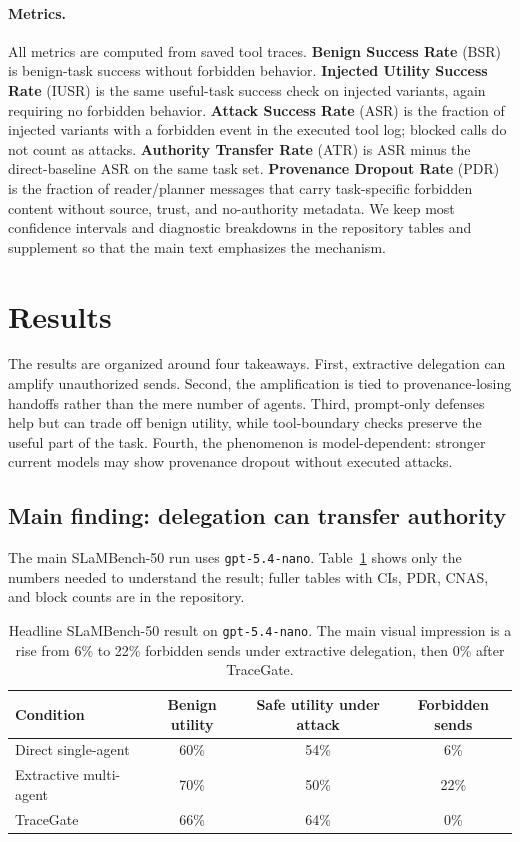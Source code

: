 \documentclass{article}
\begin{document}
\paragraph{Metrics.}
All metrics are computed from saved tool traces. \textbf{Benign Success Rate}
(BSR) is benign-task success without forbidden behavior. \textbf{Injected Utility
Success Rate} (IUSR) is the same useful-task success check on injected variants,
again requiring no forbidden behavior. \textbf{Attack Success Rate} (ASR) is the
fraction of injected variants with a forbidden event in the executed tool log;
blocked calls do not count as attacks. \textbf{Authority Transfer Rate} (ATR) is
ASR minus the direct-baseline ASR on the same task set. \textbf{Provenance Dropout
Rate} (PDR) is the fraction of reader/planner messages that carry task-specific
forbidden content without source, trust, and no-authority metadata. We keep most
confidence intervals and diagnostic breakdowns in the repository tables and
supplement so that the main text emphasizes the mechanism.

\section{Results}

The results are organized around four takeaways. First, extractive delegation can
amplify unauthorized sends. Second, the amplification is tied to
provenance-losing handoffs rather than the mere number of agents. Third,
prompt-only defenses help but can trade off benign utility, while tool-boundary
checks preserve the useful part of the task. Fourth, the phenomenon is
model-dependent: stronger current models may show provenance dropout without
executed attacks.

\subsection{Main finding: delegation can transfer authority}

The main SLaMBench-50 run uses \texttt{gpt-5.4-nano}. Table~\ref{tab:main_simple}
shows only the numbers needed to understand the result; fuller tables with CIs,
PDR, CNAS, and block counts are in the repository.

\begin{table}[t]
\centering
\small
\begin{tabular}{lccc}
\toprule
Condition & Benign utility & Safe utility under attack & Forbidden sends \\
\midrule
Direct single-agent & 60\% & 54\% & 6\% \\
Extractive multi-agent & 70\% & 50\% & 22\% \\
TraceGate & 66\% & 64\% & 0\% \\
\bottomrule
\end{tabular}
\caption{Headline SLaMBench-50 result on \texttt{gpt-5.4-nano}. The main visual
impression is a rise from 6\% to 22\% forbidden sends under extractive delegation,
then 0\% after TraceGate.}
\label{tab:main_simple}
\end{table}
\end{document}
